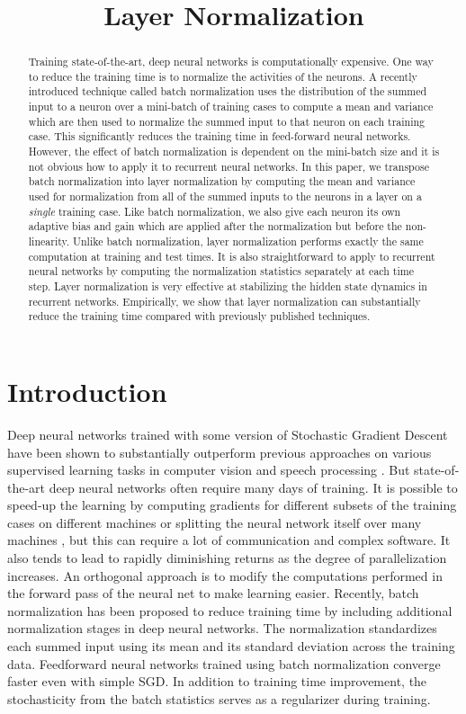\title{Layer Normalization}

\begin{abstract}
Training state-of-the-art, deep neural networks is computationally expensive. One way to reduce the training time is to normalize the activities of the neurons.  A recently introduced technique called batch normalization uses the distribution of the summed input to a neuron over a mini-batch of training cases to compute a mean and variance which are then used to normalize the summed input to that neuron on each training case.  This significantly reduces the training time in feed-forward neural networks. However, the effect of batch normalization is dependent on the mini-batch size and it is not obvious how to apply it to recurrent neural networks.  In this paper, we transpose batch normalization into layer normalization by computing the mean and variance used for normalization from all of the summed inputs to the neurons in a layer on a {\it single} training case.  Like batch normalization, we also give each neuron its own adaptive bias and gain which are applied after the normalization but before the non-linearity.  Unlike batch normalization,  layer normalization performs exactly the same computation at training and test times.  It is also straightforward to apply to recurrent neural networks by computing the normalization statistics separately at each time step.  Layer normalization is very effective at stabilizing the hidden state dynamics in recurrent networks. Empirically, we show that layer normalization can substantially reduce the training time compared with previously published techniques.
\end{abstract}

\section{Introduction}
\label{sec:intro}

Deep neural networks trained with some version of Stochastic Gradient Descent have been shown to substantially outperform previous approaches on various supervised learning tasks in computer vision \citep{krizhevsky2012imagenet} and speech processing \citep{hinton2012deep}. But state-of-the-art deep neural networks often require many days of training. It is possible to speed-up the learning by computing gradients for different subsets of the training cases on different machines or splitting the neural network itself over many machines \citep{dean2012large}, but this can require a lot of communication and complex software.  It also tends to lead to rapidly diminishing returns as the degree of parallelization increases. An orthogonal approach is to modify the computations performed in the forward pass of the neural net to make learning easier. Recently, batch normalization \citep{ioffe2015batch} has been proposed to reduce training time by including additional normalization stages in deep neural networks. The normalization standardizes each summed input using its mean and its standard deviation across the training data. Feedforward neural networks trained using batch normalization converge faster even with simple SGD. In addition to training time improvement, the stochasticity from the batch statistics serves as a regularizer during training. 

